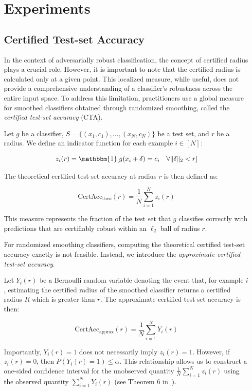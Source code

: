 \section{Experiments}\label{sec:experiments}

\subsection{Certified Test-set Accuracy}\label{subsec:certified-test-set-accuracy}
In the context of adversarially robust classification, the concept of certified radius plays a crucial role.
However, it is important to note that the certified radius is calculated only at a given point.
This localized measure, while useful, does not provide a comprehensive understanding of a classifier's robustness across the entire input space.
To address this limitation, practitioners use a global measure for smoothed classifiers obtained through randomized smoothing, called the \textit{certified test-set accuracy} (CTA).

Let $g$ be a classifier, $S = \{(x_1, c_1), \ldots, (x_N, c_N)\}$ be a test set, and $r$ be a radius.
We define an indicator function for each example $i \in [N]$:

\[
    z_i(r) = \mathbbm{1}[g(x_i + \delta) = c_i \quad \forall \|\delta\|_2 < r]
\]

The theoretical certified test-set accuracy at radius $r$ is then defined as:

\[
    \text{CertAcc}_{\text{theo}}(r) = \frac{1}{N} \sum_{i=1}^N z_i(r)
\]

This measure represents the fraction of the test set that $g$ classifies correctly with predictions that are certifiably robust within an $\ell_2$ ball of radius $r$.

For randomized smoothing classifiers, computing the theoretical certified test-set accuracy exactly is not feasible.
Instead, we introduce the \textit{approximate certified test-set accuracy}.

Let $Y_i(r)$ be a Bernoulli random variable denoting the event that, for example $i$, estimating the certified radius of the smoothed classifier returns a certified radius $R$ which is greater than $r$.
The approximate certified test-set accuracy is then:


\[
    \text{CertAcc}_{\text{approx}}(r) = \frac{1}{N} \sum_{i=1}^N Y_i(r)
\]

Importantly, $Y_i(r) = 1$ does not necessarily imply $z_{i}(r) = 1$.
However, if $z_i(r) = 0$, then $P(Y_i(r) = 1) \leq \alpha$.
This relationship allows us to construct a one-sided confidence interval for the unobserved quantity $\frac{1}{N} \sum_{i=1}^N z_{i}(r)$ using the observed quantity $\sum_{i=1}^N Y_i(r)$ (see Theorem 6 in~\citep{cohen2019certified}).

